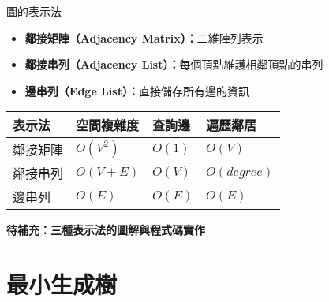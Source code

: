 \documentclass{beamer}
\begin{document}
\begin{frame}{圖的表示法}
\begin{itemize}
    \item \textbf{鄰接矩陣（Adjacency Matrix）：}二維陣列表示
    \item \textbf{鄰接串列（Adjacency List）：}每個頂點維護相鄰頂點的串列
    \item \textbf{邊串列（Edge List）：}直接儲存所有邊的資訊
\end{itemize}

\vspace{1em}
\begin{center}
\renewcommand{\arraystretch}{1.3}
\begin{tabular}{|>{\centering\arraybackslash}m{2.5cm}|>{\centering\arraybackslash}m{2cm}|>{\centering\arraybackslash}m{2cm}|>{\centering\arraybackslash}m{2cm}|}
\hline
\textbf{表示法} & \textbf{空間複雜度} & \textbf{查詢邊} & \textbf{遍歷鄰居} \\
\hline
鄰接矩陣 & $O(V^2)$ & $O(1)$ & $O(V)$ \\
\hline
鄰接串列 & $O(V+E)$ & $O(V)$ & $O(degree)$ \\
\hline
邊串列 & $O(E)$ & $O(E)$ & $O(E)$ \\
\hline
\end{tabular}
\end{center}

\vspace{1em}
\textbf{待補充：三種表示法的圖解與程式碼實作}
\end{frame}

\section{最小生成樹}
\end{document}
